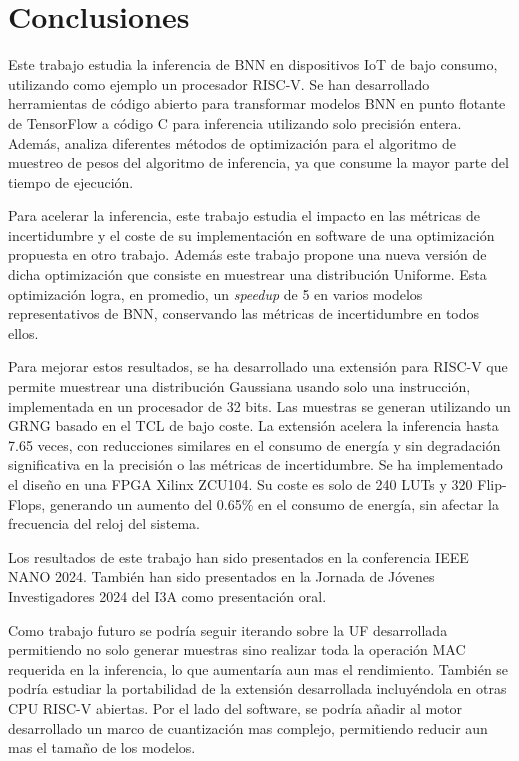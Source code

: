 \chapter{Conclusiones} \label{ch:conclusion}

Este trabajo estudia la inferencia de BNN en dispositivos IoT de bajo consumo, utilizando como ejemplo un procesador RISC-V. Se han desarrollado herramientas de código abierto para transformar modelos BNN en punto flotante de TensorFlow a código C para inferencia utilizando solo precisión entera. Además, analiza diferentes métodos de optimización para el algoritmo de muestreo de pesos del algoritmo de inferencia, ya que consume la mayor parte del tiempo de ejecución.

Para acelerar la inferencia, este trabajo estudia el impacto en las métricas de incertidumbre y el coste de su implementación en software de una optimización propuesta en otro trabajo. Además este trabajo propone una nueva versión de dicha optimización que consiste en muestrear una distribución Uniforme. Esta optimización logra, en promedio, un \textit{speedup} de 5 en varios modelos representativos de BNN, conservando las métricas de incertidumbre en todos ellos.

Para mejorar estos resultados, se ha desarrollado una extensión para RISC-V que permite muestrear una distribución Gaussiana usando solo una instrucción, implementada en un procesador de 32 bits. Las muestras se generan utilizando un GRNG basado en el TCL de bajo coste. La extensión acelera la inferencia hasta 7.65 veces, con reducciones similares en el consumo de energía y sin degradación significativa en la precisión o las métricas de incertidumbre. Se ha implementado el diseño en una FPGA Xilinx ZCU104. Su coste es solo de 240 LUTs y 320 Flip-Flops, generando un aumento del 0.65\% en el consumo de energía, sin afectar la frecuencia del reloj del sistema.

Los resultados de este trabajo han sido presentados en la conferencia IEEE NANO 2024. También han sido presentados en la Jornada de Jóvenes Investigadores 2024 del I3A como presentación oral.

Como trabajo futuro se podría seguir iterando sobre la UF desarrollada permitiendo no solo generar muestras sino realizar toda la operación MAC requerida en la inferencia, lo que aumentaría aun mas el rendimiento. También se podría estudiar la portabilidad de la extensión desarrollada incluyéndola en otras CPU RISC-V abiertas. Por el lado del software, se podría añadir al motor desarrollado un marco de cuantización mas complejo, permitiendo reducir aun mas el tamaño de los modelos.
